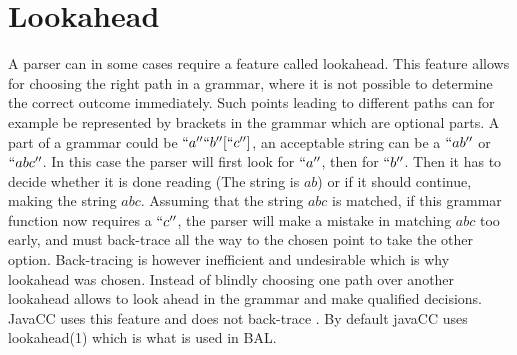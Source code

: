\section{Lookahead} \label{sec:lookahead}
A parser can in some cases require a feature called lookahead. This feature allows for choosing the right path in a grammar, where it is not possible to determine the correct outcome immediately. Such points leading to different paths can for example be represented by brackets in the grammar which are optional parts. 
A part of a grammar could be $``a'' ``b'' [``c'']$, an acceptable string can be a $``ab''$ or $``abc''$. In this case the parser will first look for $``a''$, then for $``b''$. Then it has to decide whether it is done reading (The string is $ab$) or if it should continue, making the string $abc$. Assuming that the string $abc$ is matched, if this grammar function now requires a $``c''$, the parser will make a mistake in matching $abc$ too early, and must back-trace all the way to the chosen point to take the other option. 
Back-tracing is however inefficient and undesirable which is why lookahead was chosen. Instead of blindly choosing one path over another lookahead allows to look ahead in the grammar and make qualified decisions. JavaCC uses this feature and does not back-trace . By default javaCC uses lookahead(1) which is what is used in BAL.
